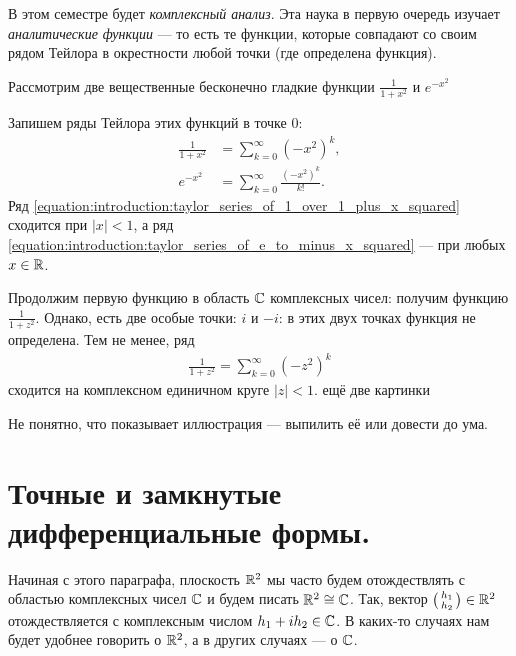 В этом семестре будет \textit{комплексный анализ}. Эта наука в первую очередь изучает \textit{аналитические функции} --- то есть те функции, которые совпадают со своим рядом Тейлора в окрестности любой точки (где определена функция).

Рассмотрим две вещественные бесконечно гладкие функции $\frac{1}{1+x^{2}}$ и $e^{-x^{2}}$

\begin{figure}[ht]
 \centering
 \caption{}
 \label{fig:similar-plots}
\end{figure}

Запишем ряды Тейлора этих функций в точке $0$:
\begin{align}
 \label{equation:introduction:taylor_series_of_1_over_1_plus_x_squared}
 \frac{1}{1+x^{2}} &= \sum_{k=0}^{\infty} (-x^{2})^{k}, \\
 \label{equation:introduction:taylor_series_of_e_to_minus_x_squared}
 e^{-x^{2}} &= \sum_{k=0}^{\infty}  \frac{(-x^{2})^{k}}{k!}.
\end{align} Ряд \eqref{equation:introduction:taylor_series_of_1_over_1_plus_x_squared} сходится при $\left| x \right| < 1$, а ряд \eqref{equation:introduction:taylor_series_of_e_to_minus_x_squared} --- при любых $x \in \mathbb{R}$.

Продолжим первую функцию в область $\mathbb{C}$ комплексных чисел: получим функцию $\frac{1}{1 + z^{2}}$. Однако, есть две особые точки: $i$ и $-i$: в этих двух точках функция не определена. Тем не менее, ряд \begin{align*}
 \frac{1}{1+z^{2}} = \sum_{k=0}^{\infty} (-z^{2})^{k}
\end{align*}  сходится на комплексном единичном круге $\left| z \right| < 1$. {\color{red} ещё две картинки}

{\color{red} Не понятно, что показывает иллюстрация --- выпилить её или довести до ума.}

\section{Точные и замкнутые дифференциальные формы.}

\begin{conventn*}
 Начиная с этого параграфа, плоскость $\mathbb{R}^{2}$ мы часто будем отождествлять с областью комплексных чисел $\mathbb{C}$ и будем писать $\mathbb{R}^{2} \cong \mathbb{C}$. Так, вектор $ \begin{psmallmatrix}
  h_1 \\ h_2
 \end{psmallmatrix} \in \mathbb{R}^{2}$ отождествляется с комплексным числом $h_1 + i h_2 \in \mathbb{C}$. В каких-то случаях нам будет удобнее говорить о $\mathbb{R}^{2}$, а в других случаях --- о $\mathbb{C}$.
\end{conventn*}

